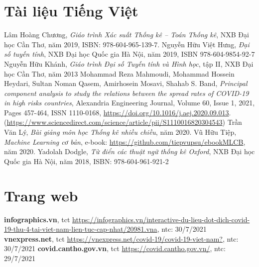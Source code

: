 \documentclass[./thesis.tex]{subfiles}
\begin{document}
	\begin{thebibliography}{10}
  
  
  	\section*{Tài liệu Tiếng Việt}
		 Lâm Hoàng Chương, \textit{Giáo trình Xác suất Thống kê -- Toán Thống kê}, NXB Đại học Cần Thơ, năm 2019, ISBN: 978-604-965-139-7.
		 Nguyễn Hữu Việt Hưng, \textit{Đại số tuyến tính}, NXB Đại học Quốc gia Hà Nội, năm 2019, ISBN 978-604-9854-92-7
		 Nguyễn Hữu Khánh, \textit{Giáo trình Đại số Tuyến tính và Hình học}, tập II, NXB Đại học Cần Thơ, năm 2013
		 Mohammad Reza Mahmoudi, Mohammad Hossein Heydari, Sultan Noman Qasem, Amirhosein Mosavi, Shahab S. Band, \textit{Principal component analysis to study the relations between the spread rates of COVID-19 in high risks countries}, Alexandria Engineering Journal, Volume 60, Issue 1, 2021, Pages 457-464, ISSN 1110-0168, \url{https://doi.org/10.1016/j.aej.2020.09.013}. (\url{https://www.sciencedirect.com/science/article/pii/S1110016820304543})
		 Trần Văn Lý, \textit{Bài giảng môn học Thống kê nhiều chiều}, năm 2020.
		 Vũ Hữu Tiệp, \textit{Machine Learning cơ bản}, e-book: \url{https://github.com/tiepvupsu/ebookMLCB}, năm 2020.
		 Yadolah Dodgle, \textit{Từ điển các thuật ngữ thống kê Oxford}, NXB Đại học Quốc gia Hà Nội, năm 2018, ISBN: 978-604-961-921-2
      
	\section*{Trang web}
		 \textbf{infographics.vn}, tct \url{https://infographics.vn/interactive-du-lieu-dot-dich-covid-19-thu-4-tai-viet-nam-lien-tuc-cap-nhat/20981.vna}, ntc: 30/7/2021
		 \textbf{vnexpress.net}, tct \url{https://vnexpress.net/covid-19/covid-19-viet-nam?}, ntc: 30/7/2021
		 \textbf{covid.cantho.gov.vn}, tct \url{https://covid.cantho.gov.vn/}, ntc: 29/7/2021
		
	\end{thebibliography}
	
\end{document}
